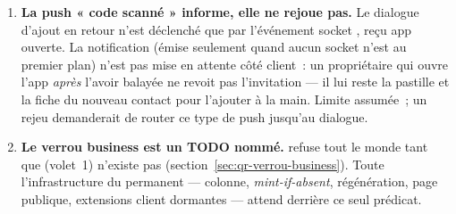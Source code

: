 \begin{enumerate}[leftmargin=1.6em]
        diffusé à tout le compte dans , et
         est lisible par toute application du même vendeur. Cela
        reste acceptable~: connaître le  d'un appareil ne permet ni de
        s'y substituer ni de le révoquer --- ces deux gestes demandent un jeton valide du
        compte. Mais c'est une raison de plus pour que l'API n'expose jamais ce champ dans
        la liste des appareils, ce qu'elle ne fait pas (pas plus que l'adresse~IP).
  \item \textbf{La push « code scanné » informe, elle ne rejoue pas.} Le dialogue
        d'ajout en retour n'est déclenché que par l'événement socket
        , reçu app ouverte. La notification
         (émise seulement quand aucun socket n'est au premier
        plan) n'est pas mise en attente côté client~: un propriétaire qui ouvre l'app
        \emph{après} l'avoir balayée ne revoit pas l'invitation --- il lui reste la
        pastille et la fiche du nouveau contact pour l'ajouter à la main. Limite
        assumée~; un rejeu demanderait de router ce type de push jusqu'au dialogue.
  \item \textbf{Le verrou business est un TODO nommé.} 
        refuse tout le monde tant que  (volet~1) n'existe pas
        (section~\ref{sec:qr-verrou-business}). Toute l'infrastructure du permanent ---
        colonne, \emph{mint-if-absent}, régénération, page publique, extensions client
        dormantes --- attend derrière ce seul prédicat.
\end{enumerate}
